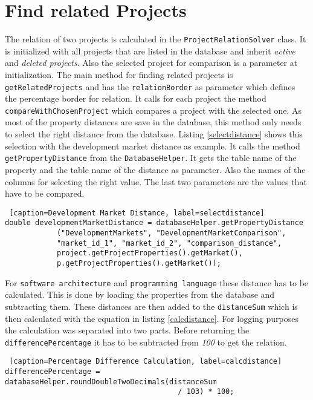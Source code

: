 \section{Find related Projects}

The relation of two projects is calculated in the \texttt{ProjectRelationSolver} class. It is initialized with all projects that are listed in the database and inherit \textit{active} and \textit{deleted projects}. Also the selected project for comparison is a parameter at initialization. The main method for finding related projects is \texttt{getRelatedProjects} and has the \texttt{relationBorder} as parameter which defines the percentage border for relation. It calls for each project the method \texttt{compareWithChosenProject} which compares a project with the selected one. As most of the property distances are save in the database, this method only needs to select the right distance from the database. Listing \ref{selectdistance} shows this selection with the development market distance as example. It calls the method \texttt{getPropertyDistance} from the \texttt{DatabaseHelper}. It gets the table name of the property and the table name of the distance as parameter. Also the names of the columns for selecting the right value. The last two parameters are the values that have to be compared.
\begin{lstlisting} [caption=Development Market Distance, label=selectdistance] 
double developmentMarketDistance = databaseHelper.getPropertyDistance
			("DevelopmentMarkets", "DevelopmentMarketComparison", 
			"market_id_1", "market_id_2", "comparison_distance",
			project.getProjectProperties().getMarket(),
		    p.getProjectProperties().getMarket());

\end{lstlisting}
For \texttt{software architecture} and \texttt{programming language} these distance has to be calculated. This is done by loading the properties from the database and subtracting them. These distances are then added to the \texttt{distanceSum} which is then calculated with the equation in listing \ref{calcdistance}. For logging purposes the calculation was separated into two parts. Before returning the \texttt{differencePercentage} it has to be subtracted from \textit{100} to get the relation.
\begin{lstlisting} [caption=Percentage Difference Calculation, label=calcdistance] 
differencePercentage = databaseHelper.roundDoubleTwoDecimals(distanceSum 
										/ 103) * 100;
\end{lstlisting}
